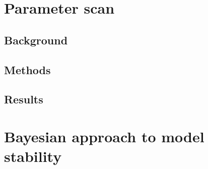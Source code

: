 
\section{Parameter scan}
\subsection{Background}
\subsection{Methods}
\subsection{Results}

\section{Bayesian approach to model stability}
